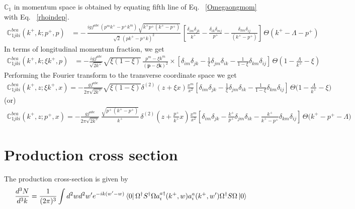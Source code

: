 \documentclass[10pt]{article}
\def\mf#1{\mathbb{#1}}
\def\v#1{\mathbf{#1}}
\numberwithin{equation}{section}
\begin{document}
$\mf{C}_{1}$ in momentum space is obtained by equating fifth line of Eq.~ \eqref{Omegaongmom} with Eq.~ \eqref{rhoindep}. 
\begin{align}
    \mf{C}^{bca}_{1jki}(k^{+},k; p^{+},p) & = -\,\frac{igf^{abc}\, \left(p^{m}k^{+}-p^{+}k^{m}\right)\,\sqrt{k^{+}p^{+}(k^{+}-p^{+})}}{\sqrt{2}\,\left(pk^{+}-p^{+}k\right)^{2}}\,\left[\frac{\delta_{im}\delta_{jk}}{k^{+}}-\frac{\delta_{ik}\delta_{mj}}{p^{+}}-\frac{\delta_{km}\delta_{ij}}{(k^{+}-p^{+})}\right]\,\Theta\left(k^{+}-\Lambda-p^{+}\right) 
\end{align}
In terms of longitudinal momentum fraction, we get
\begin{align}
  \mf{C}^{bca}_{1jki}(k^{+}, k; \xi k^{+}, p) & = -\frac{ i g f^{abc}} {\sqrt{2 k^+}} 
    \sqrt{\xi (1-\xi)}\,  
   \frac{p^m - \xi k^m  }{( \v{p}- \xi \v{k} )^2 } \times
   \left[ \delta_{im} \delta_{jk}
     - \frac{1}{\xi}\delta_{jm} \delta_{ik}
   - \frac{1}{1-\xi} \delta_{km}\delta_{ij}
 \right]\, \Theta\left(1-\frac{\Lambda}{k^{+}}-\xi\right)
\end{align}
Performing the Fourier transform to the transverse coordinate space we get
\begin{align}
   \mf{C}^{bca}_{1jki}(k^{+},z; \xi k^{+},x) = -\frac{gf^{abc}}{2\pi \sqrt{2k^{+}}}\sqrt{\xi(1-\xi)} \delta^{(2)}(z+\xi x)\frac{x^{m}}{x^{2}}\left[ \delta_{im} \delta_{jk}
     - \frac{1}{\xi}\delta_{jm} \delta_{ik}
   - \frac{1}{1-\xi} \delta_{km}\delta_{ij}
 \right]\,\Theta\bigg(1-\frac{\Lambda}{k^{+}}-\xi\bigg)
\end{align}
(or)
\begin{align}
   \mf{C}^{bca}_{1jki}(k^{+},z; p^{+},x) = -\frac{gf^{abc}}{2\pi \sqrt{2k^{+}}}\,\frac{\sqrt{p^{+}\,(k^{+}-p^{+})}}{k^{+}}\, \delta^{(2)}\left(z+\frac{p^{+}}{k^{+}} x\right)\frac{x^{m}}{x^{2}}\left[ \delta_{im} \delta_{jk}
     - \frac{k^{+}}{p^{+}}\delta_{jm} \delta_{ik}
   - \frac{k^{+}}{k^{+}-p^{+}} \delta_{km}\delta_{ij}
 \right]\,\Theta\bigg(k^{+}-p^{+}-\Lambda\bigg)
\end{align}


\section{Production cross section}

The production cross-section is given by 
\begin{equation}
\frac{d^3  N}{d^3 k} = \frac{1}{(2\pi)^{3}} \int d^{2}w d^{2} w^\prime 
e^{-ik (w^{\prime}-w)}
\bra{0}\Omega^{\dagger} S^{\dagger}\Omega a^{a\dagger}_{i}(k^{+},w) 
a^{a}_{i} (k^{+} , w^\prime) \Omega^{\dagger} S\Omega\ket{0}
\end{equation}
\end{document}
